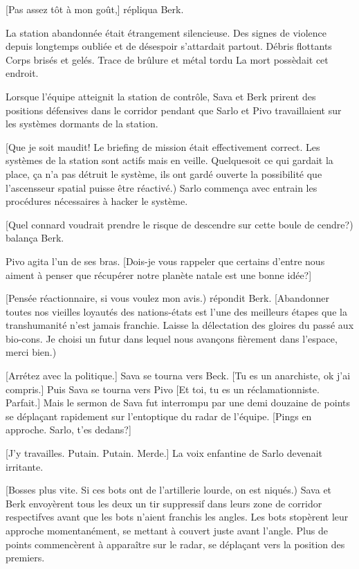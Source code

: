 [Pas assez tôt à mon goût,] répliqua Berk. 

La station abandonnée était étrangement silencieuse. Des signes de violence depuis longtemps oubliée et de désespoir s'attardait partout. Débris flottants Corps brisés et gelés. Trace de brûlure et métal tordu La mort possèdait cet endroit. 

Lorsque l'équipe atteignit la station de contrôle, Sava et Berk prirent des positions défensives dans le corridor pendant que Sarlo et Pivo travaillaient sur les systèmes dormants de la station. 

[Que je soit maudit! Le briefing de mission était effectivement correct. Les systèmes de la station sont actifs mais en veille. Quelquesoit ce qui gardait la place, ça n'a pas détruit le système, ils ont gardé ouverte la possibilité que l'ascensseur spatial puisse être réactivé.) Sarlo commença avec entrain les procédures nécessaires à hacker le système. 

[Quel connard voudrait prendre le risque de descendre sur cette boule de cendre?) balança Berk. 

Pivo agita l'un de ses bras. [Dois-je vous rappeler que certains d'entre nous aiment à penser que récupérer notre planète natale est une bonne idée?] 

[Pensée réactionnaire, si vous voulez mon avis.) répondit Berk. [Abandonner toutes nos vieilles loyautés des nations-états est l'une des meilleurs étapes que la transhumanité n'est jamais franchie. Laisse la délectation des gloires du passé aux bio-cons. Je choisi un futur dans lequel nous avançons fièrement dans l'espace, merci bien.) 

[Arrétez avec la politique.] Sava se tourna vers Beck. [Tu es un anarchiste, ok j'ai compris.] Puis Sava se tourna vers Pivo [Et toi, tu  es un réclamationniste. Parfait.] Mais le sermon de Sava fut interrompu par une demi douzaine de points se déplaçant rapidement sur l'entoptique du radar de l'équipe. [Pings en approche. Sarlo, t'es dedans?] 

[J'y travailles. Putain. Putain. Merde.] La voix enfantine de Sarlo devenait irritante. 

[Bosses plus vite. Si ces bots ont de l'artillerie lourde, on est niqués.) Sava et Berk envoyèrent tous les deux un tir suppressif dans leurs zone de corridor respectifves avant que les bots n'aient franchis les angles. Les bots stopèrent leur approche momentanément, se mettant à couvert juste avant l'angle. Plus de points commencèrent à apparaître sur le radar, se déplaçant vers la position des premiers. 

